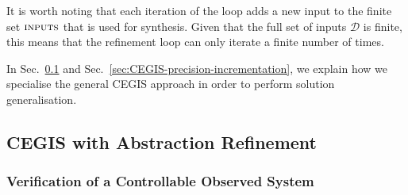 \documentclass[runningheads,a4paper]{llncs}
\begin{document}
It is
worth noting that each iteration of the loop adds a new input to the
finite set $\text{\sc inputs}$ that is used for synthesis.  Given that
the full set of inputs $\mathcal{D}$
is finite, this means that the refinement loop
can only iterate a finite number of times.

In Sec.~\ref{sec:CEGIS-abstraction-refinement} and 
Sec.~\ref{sec:CEGIS-precision-incrementation}, we explain how we 
specialise the general CEGIS approach in order to perform solution generalisation.

\subsection{CEGIS with Abstraction Refinement}
\label{sec:CEGIS-abstraction-refinement}

\subsubsection{Verification of a Controllable Observed System}
\label{sec:cof_verification}
\end{document}
